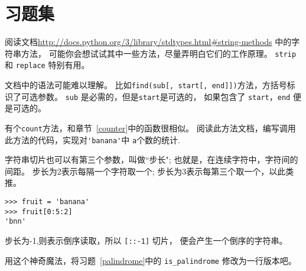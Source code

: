 \documentclass[10pt]{book}
\begin{document}
\section{习题集}

\begin{exercise}

阅读文档\url{http://docs.python.org/3/library/stdtypes.html#string-methods}
中的字符串方法，
可能你会想试试其中一些方法，尽量弄明白它们的工作原理。
{\tt strip} 和 {\tt replace} 特别有用。

文档中的语法可能难以理解。
比如\verb"find(sub[, start[, end]])"方法，方括号标识了可选参数。
 {\tt sub} 是必需的，但是{\tt start}是可选的，
如果包含了 {\tt start}，{\tt end} 便是可选的。

\end{exercise}


\begin{exercise}

有个{\tt count}方法，和章节~\ref{counter}中的函数很相似。
阅读此方法文档，编写调用此方法的代码，实现对\verb"'banana'"中
{\tt a}个数的统计.
\end{exercise}


\begin{exercise}

字符串切片也可以有第三个参数，叫做``步长";
也就是，在连续字符中，字符间的间距。
步长为2表示每隔一个字符取一个;
步长为3表示每第三个取一个，以此类推。

\begin{verbatim}
>>> fruit = 'banana'
>>> fruit[0:5:2]
'bnn'
\end{verbatim}
步长为-1,则表示倒序读取，所以 \verb"[::-1]" 切片，
便会产生一个倒序的字符串。

用这个神奇魔法，将习题~\ref{palindrome}中的 \verb"is_palindrome"
修改为一行版本吧。
\end{exercise}
\end{document}
